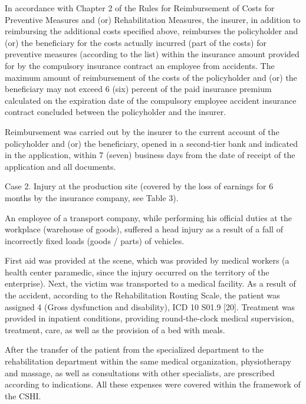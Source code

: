 \begin{multicols}{2}
In accordance with Chapter 2 of the Rules for Reimbursement of Costs for
Preventive Measures and (or) Rehabilitation Measures, the insurer, in
addition to reimbursing the additional costs specified above, reimburses
the policyholder and (or) the beneficiary for the costs actually
incurred (part of the costs) for preventive measures (according to the
list) within the insurance amount provided for by the compulsory
insurance contract an employee from accidents. The maximum amount of
reimbursement of the costs of the policyholder and (or) the beneficiary
may not exceed 6 (six) percent of the paid insurance premium calculated
on the expiration date of the compulsory employee accident insurance
contract concluded between the policyholder and the insurer.

Reimbursement was carried out by the insurer to the current account of
the policyholder and (or) the beneficiary, opened in a second-tier bank
and indicated in the application, within 7 (seven) business days from
the date of receipt of the application and all documents.

Case 2. Injury at the production site (covered by the loss of earnings
for 6 months by the insurance company, see Table 3).

An employee of a transport company, while performing his official duties
at the workplace (warehouse of goods), suffered a head injury as a
result of a fall of incorrectly fixed loads (goods / parts) of vehicles.

First aid was provided at the scene, which was provided by medical
workers (a health center paramedic, since the injury occurred on the
territory of the enterprise). Next, the victim was transported to a
medical facility. As a result of the accident, according to the
Rehabilitation Routing Scale, the patient was assigned 4 (Gross
dysfunction and disability), ICD 10 S01.9 {[}20{]}. Treatment was
provided in inpatient conditions, providing round-the-clock medical
supervision, treatment, care, as well as the provision of a bed with
meals.

After the transfer of the patient from the specialized department to the
rehabilitation department within the same medical organization,
physiotherapy and massage, as well as consultations with other
specialists, are prescribed according to indications. All these expenses
were covered within the framework of the CSHI.


\end{multicols}
